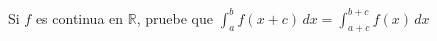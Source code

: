 \item Si $f$ es continua en $\mathbb{R}$, pruebe que $\displaystyle \int_a^b f(x + c) \, dx = \int_{a+c}^{b+c} f(x) \, dx$
